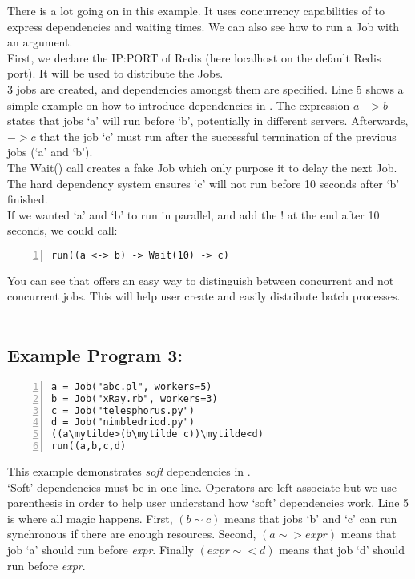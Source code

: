 There is a lot going on in this example. It uses concurrency capabilities of \lang{} to express dependencies and
waiting times. We can also see how to run a Job with an argument.\\
First, we declare the IP:PORT of Redis (here localhost on the default Redis port). It will be used to
distribute the Jobs.\\
3 jobs are created, and dependencies amongst them are specified.
Line 5 shows a simple example on how to introduce dependencies in \lang{}.
The expression $a -> b$ states that jobs `a' will run before `b', potentially in different servers. Afterwards,  $-> c$ that the job `c' must run after the successful termination of the previous jobs (`a' and `b').\\
The Wait() call creates a fake Job which only purpose it to delay the next Job. The hard dependency system
ensures `c' will not run before 10 seconds after `b' finished.\\
If we wanted `a' and `b' to run in parallel, and add the ! at the end after 10 seconds, we could call:
\begin{Verbatim}[numbers=left]
run((a <-> b) -> Wait(10) -> c)
\end{Verbatim}

You can see that \lang{} offers an easy way to distinguish between
concurrent and not concurrent jobs. This will help user create and easily distribute batch processes.\\
\\

\subsection*{Example Program 3:}
\begin{Verbatim}[numbers=left,commandchars=\\\{\}]
a = Job("abc.pl", workers=5)
b = Job("xRay.rb", workers=3)
c = Job("telesphorus.py")
d = Job("nimbledriod.py")
((a\mytilde>(b\mytilde c))\mytilde<d)
run((a,b,c,d)
\end{Verbatim}

This example demonstrates {\em soft} dependencies in \lang{}.\\
`Soft' dependencies must be in one line. Operators
are left associate but we use parenthesis in order to help
user understand how `soft' dependencies work. Line 5 is where all
magic happens. First, $(b\sim c)$ means that jobs `b' and `c' can run 
synchronous if there are enough resources. Second,
$(a\sim>expr)$ means that job `a' should run before \textit{expr}. 
Finally $(expr\sim<d)$ means that job `d' should run before \textit{expr}.\\
\\

